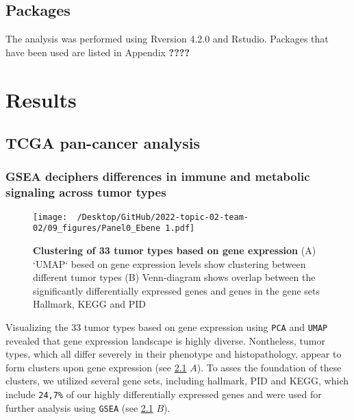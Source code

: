 \documentclass[
  parskip,
  oneside]{scrreprt}
\begin{document}
\hypertarget{packages}{%
\section{Packages}\label{packages}}

The analysis was performed using Rversion 4.2.0 and Rstudio. Packages
that have been used are listed in Appendix \textbf{????}

\hypertarget{results}{%
\chapter{Results}\label{results}}

\hypertarget{tcga-pan-cancer-analysis-1}{%
\section{TCGA pan-cancer analysis}\label{tcga-pan-cancer-analysis-1}}

\hypertarget{gsea-deciphers-differences-in-immune-and-metabolic-signaling-across-tumor-types}{%
\subsection{GSEA deciphers differences in immune and metabolic signaling
across tumor
types}\label{gsea-deciphers-differences-in-immune-and-metabolic-signaling-across-tumor-types}}

\begin{figure}[h]
  \texttt{[image: ~/Desktop/GitHub/2022-topic-02-team-02/09\_figures/Panel0\_Ebene 1.pdf]}
  \caption{\textbf{Clustering of 33 tumor types based on gene expression} (A) `UMAP` besed on gene expression levels show clustering between different tumor types (B) Venn-diagram shows overlap between the significantly differentially expressed genes and genes in the gene sets Hallmark, KEGG and PID}
  \label{`UMAP`}
\end{figure}

Visualizing the 33 tumor types based on gene expression using
\texttt{PCA} and \texttt{UMAP} revealed that gene expression landscape
is highly diverse. Nontheless, tumor types, which all differ severely in
their phenotype and histopathology, appear to form clusters upon gene
expression (see \cref{`UMAP`} \(A\)). To asses the foundation of these
clusters, we utilized several gene sets, including hallmark, PID and
KEGG, which include \texttt{24,7\%} of our highly differentially
expressed genes and were used for further analysis using \texttt{GSEA}
(see \cref{`UMAP`} \(B\)).
\end{document}
